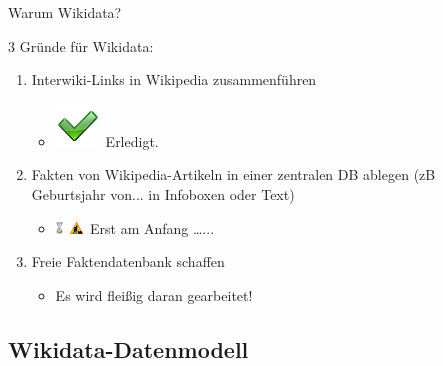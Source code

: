 \documentclass{beamer}
\begin{document}
\begin{frame}{Warum Wikidata?}

3 Gründe für Wikidata:

  \vspace{0.3cm}

  \begin{enumerate}
    \item Interwiki-Links in Wikipedia zusammenführen \pause
      \begin{itemize}
        \item \includegraphics[width=.3cm]{check.png}~Erledigt. \pause
      \end{itemize}

  \vspace{0.3cm}

    \item Fakten von Wikipedia-Artikeln in einer zentralen DB ablegen (zB Geburtsjahr von... in Infoboxen oder Text) \pause
      \begin{itemize}
        \item \includegraphics[height=3mm]{Hourglass_2.pdf}~\includegraphics[height=3mm]{Road-under-construction.png}~Erst am Anfang \dots... \pause
      \end{itemize}

  \vspace{0.3cm}

    \item Freie Faktendatenbank schaffen \pause
      \begin{itemize}
        \item Es wird fleißig daran gearbeitet!
      \end{itemize}
  \end{enumerate}

\end{frame}

\subsection{Wikidata-Datenmodell}
\end{document}
